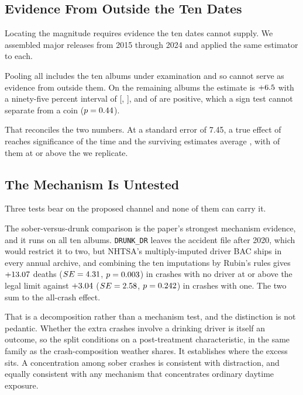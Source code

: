 \documentclass[11pt]{article}
\begin{document}
\subsection{Evidence From Outside the Ten Dates}

Locating the magnitude requires evidence the ten dates cannot supply. We assembled
\numNAllAlbums{} major releases from 2015 through 2024 and applied the same estimator to each.



Pooling all \numNAllAlbums{} includes the ten albums under examination and so cannot serve as
evidence from outside them. On the \numNOutsidePaper{} remaining albums the estimate is
$+6.5$ with a ninety-five percent interval of [\numCIOutsideLo,
\numCIOutsideHi], and \numNPositiveOutside{} of \numNOutsidePaper{} are positive, which a sign test
cannot separate from a coin ($p = 0.44$).

That reconciles the two numbers. At a standard error of 7.45, a true effect of
\numEffectOutsidePaper{} reaches significance \numPowerAtOutside{} of the time and the surviving
estimates average \numMeanPublishedAtOutside{}, with \numPReachReplicated{} of them at or above the
\numEffectRegression{} we replicate.



\subsection{The Mechanism Is Untested}

Three tests bear on the proposed channel and none of them can carry it.

The sober-versus-drunk comparison is the paper's strongest mechanism evidence, and it runs on all
ten albums. \texttt{DRUNK\_DR} leaves the accident file after 2020, which would restrict it to
two, but NHTSA's multiply-imputed driver BAC ships in every annual archive, and combining the ten imputations by Rubin's rules gives $+13.07$ deaths
($SE = 4.31$, $p = 0.003$) in crashes with no driver at or above the legal
limit against $+3.04$ ($SE = 2.58$, $p = 0.242$) in crashes with one.
The two sum to the all-crash effect.

That is a decomposition rather than a mechanism test, and the distinction is not pedantic. Whether
the extra crashes involve a drinking driver is itself an outcome, so the split conditions on a
post-treatment characteristic, in the same family as the crash-composition weather shares. It
establishes where the excess sits. A concentration among sober crashes is consistent with
distraction, and equally consistent with any mechanism that concentrates ordinary daytime
exposure.
\end{document}
